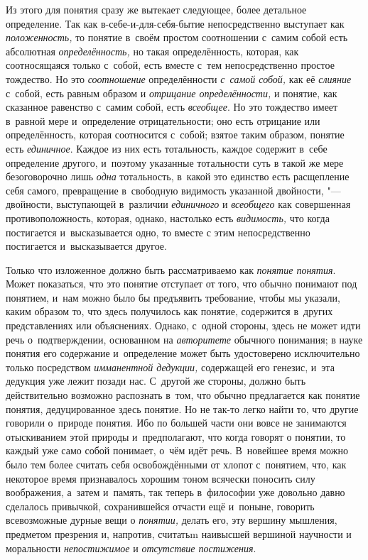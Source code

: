 Из этого для понятия сразу же вытекает следующее, более детальное
определение. Так как в-себе-и-для-себя-бытие непосредственно выступает как
{\em положенность,} то понятие в~своём простом соотношении с~самим собой есть
абсолютная {\em определённость,} но такая определённость, которая, как
соотносящаяся только с~собой, есть вместе с~тем непосредственно простое
тождество. Но это {\em соотношение} определённости {\em с~самой собой,} как
её {\em слияние} с~собой, есть равным образом и {\em отрицание определённости,}
и понятие, как сказанное равенство с~самим собой, есть {\em всеобщее}.
Но это тождество имеет в~равной мере и~определение отрицательности; оно есть
отрицание или определённость, которая соотносится с~собой; взятое таким
образом, понятие есть {\em единичное}. Каждое из них есть тотальность, каждое
содержит в~себе определение другого, и~поэтому указанные тотальности суть в
такой же мере безоговорочно лишь {\em одна} тотальность, в~какой это
единство есть расщепление себя самого, превращение в~свободную видимость
указанной двойности, "--- двойности, выступающей в~различии {\em единичного}
и {\em всеобщего} как совершенная противоположность, которая, однако, настолько
есть {\em видимость,} что когда постигается и~высказывается одно, то вместе
с этим непосредственно постигается и~высказывается другое.

Только что изложенное должно быть рассматриваемо как {\em понятие понятия}.
Может показаться, что это понятие отступает от того, что обычно понимают под
понятием, и~нам можно было бы предъявить требование, чтобы мы указали, каким
образом то, что здесь получилось как понятие, содержится в~других
представлениях или объяснениях. Однако, с~одной стороны, здесь не может идти
речь о~подтверждении, основанном на {\em авторитете} обычного понимания; в
науке понятия его содержание и~определение может быть удостоверено
исключительно только посредством {\em имманентной дедукции,} содержащей его
генезис, и~эта дедукция уже лежит позади нас. С~другой же стороны, должно
быть действительно возможно распознать в~том, что обычно предлагается как
понятие понятия, дедуцированное здесь понятие. Но не так-то легко найти то,
что другие говорили о~природе понятия. Ибо по большей части они вовсе не
занимаются отыскиванием этой природы и~предполагают, что когда говорят о
понятии, то каждый уже само собой понимает, о~чём идёт речь. В~новейшее
время можно было тем более считать себя освобождёнными от хлопот с~понятием,
что, как некоторое время признавалось хорошим тоном всячески поносить силу
воображения, а~затем и~память, так теперь в~философии уже довольно давно
сделалось привычкой, сохранившейся отчасти ещё и~поныне, говорить
всевозможные дурные вещи о {\em понятии,} делать его, эту вершину мышления,
предметом презрения и, напротив, считатьm наивысшей вершиной научности и
моральности {\em непостижимое} и {\em отсутствие постижения}.

